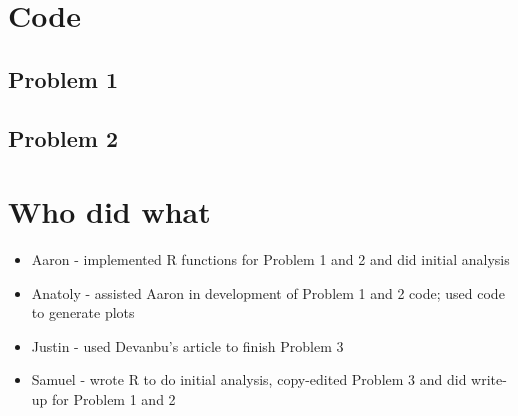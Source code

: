 \documentclass{article}
\begin{document}
\pagebreak

\appendix
\section{Code}
\subsection{Problem 1}

\subsection{Problem 2}


\section{Who did what}
\begin{itemize}
	\item Aaron - implemented R functions for Problem 1 and 2 and did initial analysis
	\item Anatoly - assisted Aaron in development of Problem 1 and 2 code; used code to generate plots
	\item Justin - used Devanbu's article to finish Problem 3
	\item Samuel - wrote R to do initial analysis, copy-edited Problem 3 and did write-up for Problem 1 and 2
\end{itemize}
\end{document}
